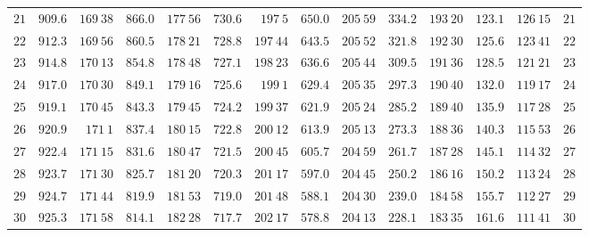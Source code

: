 \begin{GaussVICeresFrame}{.92}
{\begin{tabular}{r@{\GaussVICeresRule}r|r@{\GaussVICeresRule}r|r@{\GaussVICeresRule}r|r@{\GaussVICeresRule}r|r@{\GaussVICeresRule}r|r@{\GaussVICeresRule}r|r@{\GaussVICeresRule}r}
$21$ & $909.6$ & $169\ 38$ & $866.0$ & $177\ 56$ & $730.6$ & $197\ 5$ & $650.0$ & $205\ 59$ & $334.2$ & $193\ 20$ & $123.1$ & $126\ 15$ & $21$ \\
$22$ & $912.3$ & $169\ 56$ & $860.5$ & $178\ 21$ & $728.8$ & $197\ 44$ & $643.5$ & $205\ 52$ & $321.8$ & $192\ 30$ & $125.6$ & $123\ 41$ & $22$ \\
$23$ & $914.8$ & $170\ 13$ & $854.8$ & $178\ 48$ & $727.1$ & $198\ 23$ & $636.6$ & $205\ 44$ & $309.5$ & $191\ 36$ & $128.5$ & $121\ 21$ & $23$ \\
$24$ & $917.0$ & $170\ 30$ & $849.1$ & $179\ 16$ & $725.6$ & $199\ 1$ & $629.4$ & $205\ 35$ & $297.3$ & $190\ 40$ & $132.0$ & $119\ 17$ & $24$ \\
$25$ & $919.1$ & $170\ 45$ & $843.3$ & $179\ 45$ & $724.2$ & $199\ 37$ & $621.9$ & $205\ 24$ & $285.2$ & $189\ 40$ & $135.9$ & $117\ 28$ & $25$ \\[3pt]
$26$ & $920.9$ & $171\ 1$ & $837.4$ & $180\ 15$ & $722.8$ & $200\ 12$ & $613.9$ & $205\ 13$ & $273.3$ & $188\ 36$ & $140.3$ & $115\ 53$ & $26$ \\
$27$ & $922.4$ & $171\ 15$ & $831.6$ & $180\ 47$ & $721.5$ & $200\ 45$ & $605.7$ & $204\ 59$ & $261.7$ & $187\ 28$ & $145.1$ & $114\ 32$ & $27$ \\
$28$ & $923.7$ & $171\ 30$ & $825.7$ & $181\ 20$ & $720.3$ & $201\ 17$ & $597.0$ & $204\ 45$ & $250.2$ & $186\ 16$ & $150.2$ & $113\ 24$ & $28$ \\
$29$ & $924.7$ & $171\ 44$ & $819.9$ & $181\ 53$ & $719.0$ & $201\ 48$ & $588.1$ & $204\ 30$ & $239.0$ & $184\ 58$ & $155.7$ & $112\ 27$ & $29$ \\
$30$ & $925.3$ & $171\ 58$ & $814.1$ & $182\ 28$ & $717.7$ & $202\ 17$ & $578.8$ & $204\ 13$ & $228.1$ & $183\ 35$ & $161.6$ & $111\ 41$ & $30$ \\
\end{tabular}\par}
\end{GaussVICeresFrame}

